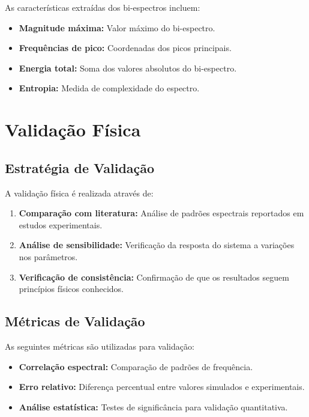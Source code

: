 As características extraídas dos bi-espectros incluem:

\begin{itemize}
    \item \textbf{Magnitude máxima:} Valor máximo do bi-espectro.
    \item \textbf{Frequências de pico:} Coordenadas dos picos principais.
    \item \textbf{Energia total:} Soma dos valores absolutos do bi-espectro.
    \item \textbf{Entropia:} Medida de complexidade do espectro.
\end{itemize}

\section{Validação Física}

\subsection{Estratégia de Validação}

A validação física é realizada através de:

\begin{enumerate}
    \item \textbf{Comparação com literatura:} Análise de padrões espectrais reportados em estudos experimentais.
    \item \textbf{Análise de sensibilidade:} Verificação da resposta do sistema a variações nos parâmetros.
    \item \textbf{Verificação de consistência:} Confirmação de que os resultados seguem princípios físicos conhecidos.
\end{enumerate}

\subsection{Métricas de Validação}

As seguintes métricas são utilizadas para validação:

\begin{itemize}
    \item \textbf{Correlação espectral:} Comparação de padrões de frequência.
    \item \textbf{Erro relativo:} Diferença percentual entre valores simulados e experimentais.
    \item \textbf{Análise estatística:} Testes de significância para validação quantitativa.
\end{itemize}

